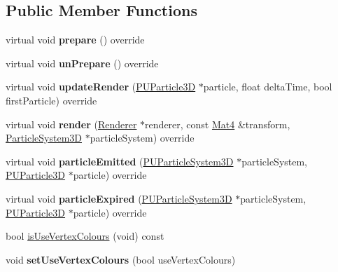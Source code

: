 \subsection*{Public Member Functions}
\begin{DoxyCompactItemize}
\item 
\mbox{\label{classPUBeamRender_ac8c13ab98be7424a57bd0ce92847782b}} 
virtual void {\bfseries prepare} () override
\item 
\mbox{\label{classPUBeamRender_a67973cac90f56742bf17788c1601d197}} 
virtual void {\bfseries un\+Prepare} () override
\item 
\mbox{\label{classPUBeamRender_a31beb8a01e713b0fd3065f4a9aff0657}} 
virtual void {\bfseries update\+Render} (\hyperlink{structPUParticle3D}{P\+U\+Particle3D} $\ast$particle, float delta\+Time, bool first\+Particle) override
\item 
\mbox{\label{classPUBeamRender_a8738d1b940f6bc633ea5c785aa9c7f7b}} 
virtual void {\bfseries render} (\hyperlink{classRenderer}{Renderer} $\ast$renderer, const \hyperlink{classMat4}{Mat4} \&transform, \hyperlink{classParticleSystem3D}{Particle\+System3D} $\ast$particle\+System) override
\item 
\mbox{\label{classPUBeamRender_af6fefb46a477293435f67a977b25dc56}} 
virtual void {\bfseries particle\+Emitted} (\hyperlink{classPUParticleSystem3D}{P\+U\+Particle\+System3D} $\ast$particle\+System, \hyperlink{structPUParticle3D}{P\+U\+Particle3D} $\ast$particle) override
\item 
\mbox{\label{classPUBeamRender_ad13135c6800e201429886875b5918708}} 
virtual void {\bfseries particle\+Expired} (\hyperlink{classPUParticleSystem3D}{P\+U\+Particle\+System3D} $\ast$particle\+System, \hyperlink{structPUParticle3D}{P\+U\+Particle3D} $\ast$particle) override
\item 
bool \hyperlink{classPUBeamRender_a2d144c9e1b72dca28de6b1a47a724820}{is\+Use\+Vertex\+Colours} (void) const
\item 
\mbox{\label{classPUBeamRender_afa47e268a199f44cf542e38f4445e7d6}} 
void {\bfseries set\+Use\+Vertex\+Colours} (bool use\+Vertex\+Colours)

\end{DoxyCompactItemize}
